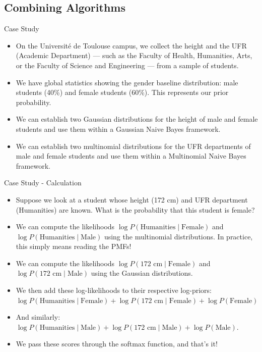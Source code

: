 \subsection[Combining Algorithms]{Combining Algorithms}

\begin{frame}{Case Study}
	\begin{itemize}
		\item On the Université de Toulouse campus, we collect the height and the UFR (Academic Department) — such as the Faculty of Health, Humanities, Arts, or the Faculty of Science and Engineering — from a sample of students.
		\pause
		\item We have global statistics showing the gender baseline distribution: male students (40\%) and female students (60\%). This represents our prior probability.
		\pause
		\item We can establish two Gaussian distributions for the height of male and female students and use them within a Gaussian Naive Bayes framework.
		\pause
		\item We can establish two multinomial distributions for the UFR departments of male and female students and use them within a Multinomial Naive Bayes framework.
	\end{itemize}
\end{frame}

\begin{frame}{Case Study - Calculation}
	\begin{itemize}
		\item Suppose we look at a student whose height (172 cm) and UFR department (Humanities) are known. What is the probability that this student is female?
		\pause
		\item We can compute the likelihoods $\log P(\text{Humanities} \mid \text{Female})$ and $\log P(\text{Humanities} \mid \text{Male})$ using the multinomial distributions. In practice, this simply means reading the PMFs!
		\pause
		\item We can compute the likelihoods $\log P(\text{172 cm} \mid \text{Female})$ and $\log P(\text{172 cm} \mid \text{Male})$ using the Gaussian distributions.
		\pause
		\item We then add these log-likelihoods to their respective log-priors: $\log P(\text{Humanities} \mid \text{Female}) + \log P(\text{172 cm} \mid \text{Female}) + \log P(\text{Female})$
		\pause
		\item And similarly: $\log P(\text{Humanities} \mid \text{Male}) + \log P(\text{172 cm} \mid \text{Male}) + \log P(\text{Male})$. 
		\pause
		\item We pass these scores through the softmax function, and that's it!
	\end{itemize}
\end{frame}

